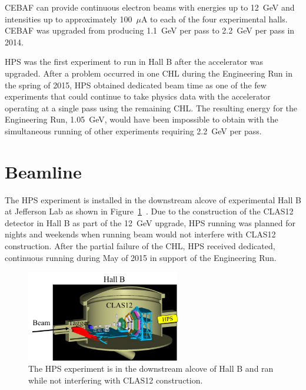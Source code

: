 CEBAF can provide continuous electron beams with energies up to 12~GeV and intensities up to approximately 100~$\mu$A to each of the four experimental halls. CEBAF was upgraded from producing 1.1~GeV per pass to 2.2~GeV per pass in 2014. 

HPS was the first experiment to run in Hall B after the accelerator was upgraded. After a problem occurred in one CHL during the Engineering Run in the spring of 2015, HPS obtained dedicated beam time as one of the few experiments that could continue to take physics data with the accelerator operating at a single pass using the remaining CHL. The resulting energy for the Engineering Run, 1.05~GeV, would have been impossible to obtain with the simultaneous running of other experiments requiring 2.2~GeV per pass.  

\section{Beamline}
The HPS experiment is installed in the downstream alcove of experimental Hall B at Jefferson Lab as shown in Figure~\ref{Figure:hallB}~\cite{beamline_nim_2017}. Due to the construction of the CLAS12 detector in Hall B as part of the 12~GeV upgrade, HPS running was planned for nights and weekends when running beam would not interfere with CLAS12 construction. After the partial failure of the CHL, HPS received dedicated, continuous running during May of 2015 in support of the Engineering Run. 

\begin{figure}[htb]
  \centering
      \includegraphics[width=0.6\textwidth]{pics/experiment/hallB.png}
  \caption[HPS location in Hall B]{The HPS experiment is in the downstream alcove of Hall B and ran while not interfering with CLAS12 construction.}
  \label{Figure:hallB}
\end{figure}

